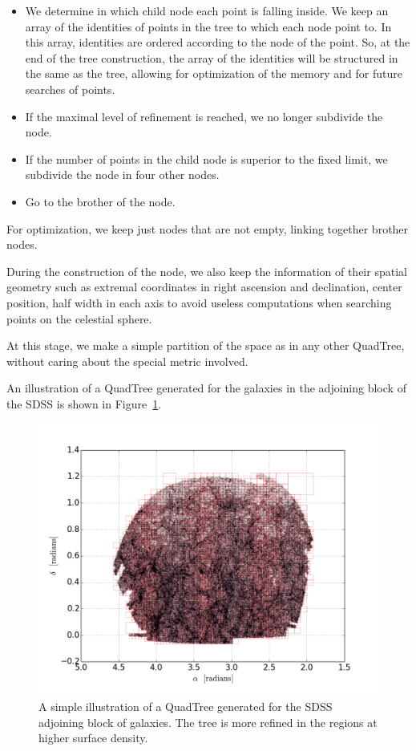 \begin{itemize}
    \item We determine in which child node each point is falling inside. We
        keep an array of the identities of points in the tree to which each
        node point to. In this array, identities are ordered according to the
        node of the point. So, at the end of the tree construction, the array
        of the identities will be structured in the same as the tree, allowing
        for optimization of the memory and for future searches of points.
    \item If the maximal level of refinement is reached, we no longer subdivide
        the node.
    \item If the number of points in the child node is superior to the fixed
        limit, we subdivide the node in four other nodes.
    \item Go to the brother of the node.
\end{itemize}
%
For optimization, we keep just nodes that are not empty, linking together
brother nodes.

During the construction of the node, we also keep the information of their
spatial geometry such as extremal coordinates in right ascension and
declination, center position, half width in each axis to avoid useless
computations when searching points on the celestial sphere.

At this stage, we make a simple partition of the space as in any other
QuadTree, without caring about the special metric involved.

An illustration of a QuadTree generated for the galaxies in the adjoining
block of the SDSS is shown in Figure~\ref{fig:quadtree}.
%
\begin{figure}
    \centering
    \includegraphics[width=0.7\linewidth]{figures/appendix/quadtree/quadtree.png}
    \caption{A simple illustration of a QuadTree generated for the SDSS
    adjoining block of galaxies. The tree is more refined in the regions at
higher surface density.\label{fig:quadtree}}
\end{figure}
%
